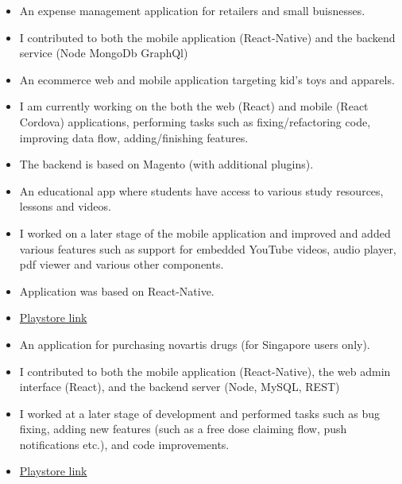 \documentclass[10pt,a4paper,ragged2e]{altacv}
\begin{document}
\begin{itemize}
\item An expense management application for retailers and small buisnesses.
\item I contributed to both the mobile application (React-Native) and the backend service (Node MongoDb GraphQl) 
\end{itemize}
\smallskip
\smallskip 


\begin{itemize}
\item An ecommerce web and mobile application targeting kid's toys and apparels. 
\item I am currently working on the both the web (React) and mobile (React Cordova) applications, performing tasks such as fixing/refactoring code, improving data flow, adding/finishing features. 
\item The backend is based on Magento (with additional plugins). 
\end{itemize}
\smallskip
\smallskip 




\begin{itemize}
\item An educational app where students have access to various study resources, lessons and videos. 
\item I worked on a later stage of the mobile application and improved and added various features such as support for embedded YouTube videos, audio player, pdf viewer and various other components. 
\item Application was based on React-Native. 
\item \href{https://play.google.com/store/apps/details?id=com.leap.skills}{Playstore link}
\end{itemize}
\smallskip
\smallskip 


\begin{itemize}
\item An application for purchasing novartis drugs (for Singapore users only). 
\item I contributed to both the mobile application (React-Native), the web admin interface (React), and the backend server (Node, MySQL, REST)
\item I worked at a later stage of development and performed tasks such as bug fixing, adding new features (such as a free dose claiming flow, push notifications etc.), and code improvements. 
\item \href{https://play.google.com/store/apps/details?id=com.novartispsp}{Playstore link}
\end{itemize}
\smallskip
\smallskip 




\cvproject{}

\divider


\clearpage

\nocite{*}
\end{document}
